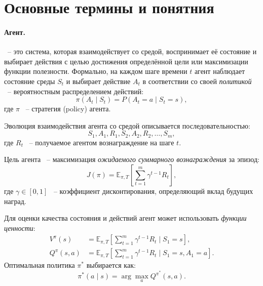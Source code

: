 \section{Основные термины и понятния}

\paragraph{Агент.} ~-- это система, которая взаимодействует со средой, воспринимает её состояние и выбирает действия с целью достижения определённой цели или максимизации функции полезности. Формально, на каждом шаге времени $t$ агент наблюдает состояние среды $S_t$ и выбирает действие $A_t$ в соответствии со своей \emph{политикой} ~-- вероятностным распределением действий:
\begin{equation}
\pi(A_t \mid S_t) = P(A_t = a \mid S_t = s),
\end{equation}
где $\pi$ ~-- стратегия (policy) агента.  

Эволюция взаимодействия агента со средой описывается последовательностью:
\begin{equation}
S_1, A_1, R_1, S_2, A_2, R_2, \dots, S_m,
\end{equation}
где $R_t$ ~-- получаемое агентом вознаграждение на шаге $t$.  

Цель агента ~-- максимизация \emph{ожидаемого суммарного вознаграждения} за эпизод:
\begin{equation}
J(\pi) = \mathbb{E}_{\pi, T}\left[\sum_{t=1}^{m} \gamma^{t-1} R_t\right],
\end{equation}
где $\gamma \in [0,1]$ ~-- коэффициент дисконтирования, определяющий вклад будущих наград.

Для оценки качества состояния и действий агент может использовать \emph{функции ценности}:
\begin{align}
V^{\pi}(s) &= \mathbb{E}_{\pi, T}\!\left[\sum_{t=1}^{m} \gamma^{t-1} R_t \mid S_1 = s\right], \\
Q^{\pi}(s,a) &= \mathbb{E}_{\pi, T}\!\left[\sum_{t=1}^{m} \gamma^{t-1} R_t \mid S_1 = s, A_1 = a\right].
\end{align}
Оптимальная политика $\pi^*$ выбирается как:
\begin{equation}
\pi^*(a \mid s) = \arg\max_{a} Q^{\pi^*}(s,a).
\end{equation}

